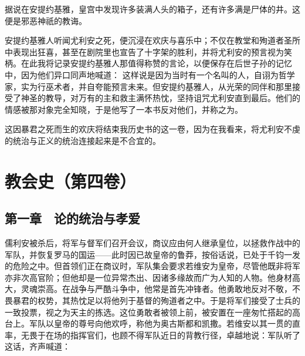 据说在安提约基雅，皇宫中发现许多装满人头的箱子，还有许多满是尸体的井。这便是邪恶神祇的教诲。\par

安提约基雅人听闻尤利安之死，便沉浸在欢庆与喜乐中；不仅在教堂和殉道者圣所中表现出狂喜，甚至在剧院里也宣告了十字架的胜利，并将尤利安的预言视为笑柄。在此我将记录安提约基雅人那值得称赞的言论，以便保存在后世子孙的记忆中，因为他们异口同声地喊道： 这样说是因为当时有一个名叫的人，自诩为哲学家，实为行巫术者，并自夸能预言未来。但安提约基雅人，从光荣的同伴和那里接受了神圣的教导，对万有的主和救主满怀热忱，坚持诅咒尤利安直到最后。他们的情感被那对象完全知晓，于是他写了一本书反对他们，并称之为。\par

这因暴君之死而生的欢庆将结束我历史书的这一卷，因为在我看来，将尤利安不虔的统治与正义的统治连接起来是不合宜的。\par



\section{教会史（第四卷）}


\subsection{第一章　论的统治与孝爱}

儒利安被杀后，将军与督军们召开会议，商议应由何人继承皇位，以拯救作战中的军队，并恢复罗马的国运——此时因已故皇帝的鲁莽，按俗话说，已处于千钧一发的危险之中。但首领们正在商议时，军队集会要求若维安为皇帝，尽管他既非将军亦非次高官阶；但他却是一位异常杰出、因诸多缘故而广为人知的人物。他身材高大，灵魂崇高。在战争与严酷斗争中，他常是首先冲锋者。他勇敢地反对不敬，不畏暴君的权势，其热忱足以将他列于基督的殉道者之中。于是将军们接受了士兵的一致投票，视之为天主的拣选。这位勇敢者被领上前，被安置在一座匆忙搭起的高台上。军队以皇帝的尊号向他欢呼，称他为奥古斯都和凯撒。若维安以其一贯的直率，无畏于在场的指挥官们，也顾不得军队近日的背教行径，卓越地说：军队听了这话，齐声喊道：\par

